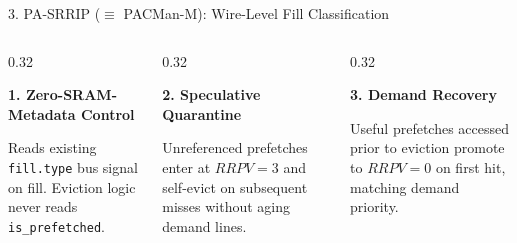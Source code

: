 \documentclass[aspectratio=169, 10pt]{beamer}
\begin{document}
\begin{frame}{3. PA-SRRIP ($\equiv$ PACMan-M): Wire-Level Fill Classification}
  \vspace{0.18cm}
  \begin{columns}[onlytextwidth]
    \begin{column}{0.32\textwidth}
      \begin{tcolorbox}[archpanel, top=1.0mm, bottom=1.0mm]
        {\scriptsize\textbf{\color{Obsidian}1. Zero-SRAM-Metadata Control}}\par\vspace{0.02cm}
        {\tiny Reads existing \texttt{fill.type} bus signal on fill. Eviction logic never reads \texttt{is\_prefetched}.}
      \end{tcolorbox}
    \end{column}%
    \hfill%
    \begin{column}{0.32\textwidth}
      \begin{tcolorbox}[archpanel, top=1.0mm, bottom=1.0mm]
        {\scriptsize\textbf{\color{Obsidian}2. Speculative Quarantine}}\par\vspace{0.02cm}
        {\tiny Unreferenced prefetches enter at $RRPV=3$ and self-evict on subsequent misses without aging demand lines.}
      \end{tcolorbox}
    \end{column}%
    \hfill%
    \begin{column}{0.32\textwidth}
      \begin{tcolorbox}[tealpanel, top=1.0mm, bottom=1.0mm]
        {\scriptsize\textbf{\color{Obsidian}3. Demand Recovery}}\par\vspace{0.02cm}
        {\tiny Useful prefetches accessed prior to eviction promote to $RRPV=0$ on first hit, matching demand priority.}
      \end{tcolorbox}
    \end{column}
  \end{columns}
\end{frame}
\end{document}
